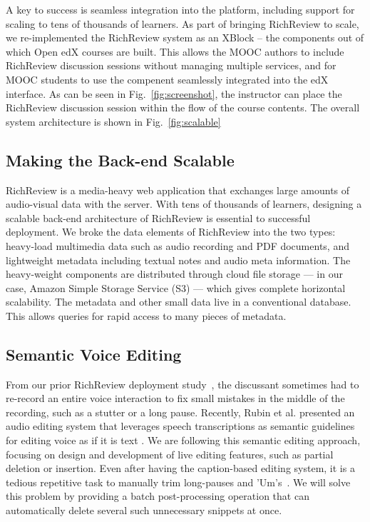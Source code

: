 \documentclass{sigchi}
\begin{document}
A key to success is seamless integration into the platform, including support for scaling to tens of thousands of learners. As part of bringing RichReview to scale, we re-implemented the RichReview system as an XBlock -- the components out of which Open edX courses are built.
This allows the MOOC authors to include RichReview discussion sessions without managing multiple services, and for MOOC students to use the compenent seamlessly integrated into the edX interface.
As can be seen in Fig.~\ref{fig:screenshot}, the instructor can place the RichReview discussion session within the flow of the course contents. The overall system architecture is shown in Fig.~\ref{fig:scalable}

\subsection{Making the Back-end Scalable}
RichReview is a media-heavy web application that exchanges large amounts of audio-visual data with the server.
With tens of thousands of learners, designing a scalable back-end architecture of RichReview is essential to successful deployment.
We broke the data elements of RichReview into the two types: heavy-load multimedia data such as audio recording and PDF documents, and lightweight metadata including textual notes and audio meta information.
The heavy-weight components are distributed through cloud file storage --- in our case, Amazon Simple Storage Service (S3) --- which gives complete horizontal scalability. The metadata and other small data live in a conventional database. This allows queries for rapid access to many pieces of metadata.

\subsection{Semantic Voice Editing}
From our prior RichReview deployment study~\cite{yoon2015richreview}, the discussant sometimes had to re-record an entire voice interaction to fix small mistakes in the middle of the recording, such as a stutter or a long pause.
Recently, Rubin et al. presented an audio editing system that leverages speech transcriptions as semantic guidelines for editing voice as if it is text \cite{rubin2013content}.
We are following this semantic editing approach, focusing on design and development of live editing features, such as partial deletion or insertion.
Even after having the caption-based editing system, it is a tedious repetitive task to manually trim long-pauses and 'Um's~\cite{yoon2014richreview}.
We will solve this problem by providing a batch post-processing operation that can automatically delete several such unnecessary snippets at once.
\end{document}
